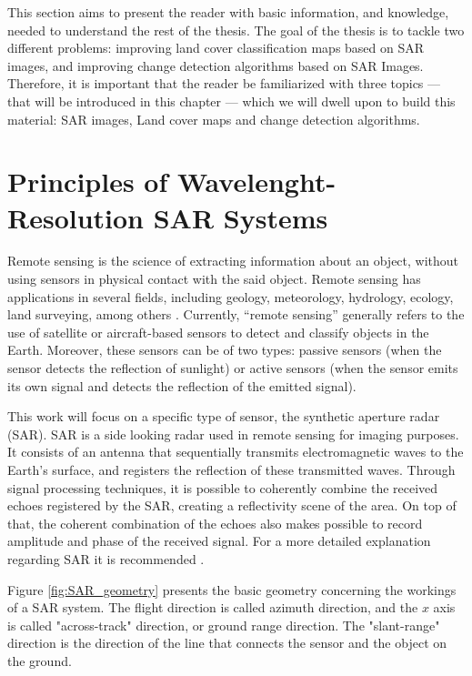 This section aims to present the reader with basic information, and knowledge, needed to understand the rest of the thesis. 
The goal of the thesis is to tackle two different problems: improving land cover classification maps based on SAR images, and improving 
change detection algorithms based on SAR Images. 
Therefore, it is important that the reader be familiarized with three topics --- that will be introduced in this chapter --- which we will dwell upon to build this material: SAR images, Land cover maps and
change detection algorithms.

\section{Principles of Wavelenght-Resolution SAR Systems}
Remote sensing is the science of extracting information about an object, without using sensors in physical contact with the said object. Remote sensing has applications in several fields, including geology, meteorology, hydrology, ecology, land surveying, among others \cite{survey-rs}. Currently, ``remote sensing'' generally refers to the use of satellite or aircraft-based sensors to detect and classify objects in the Earth. Moreover, these sensors can be of two types: passive sensors (when the sensor detects the reflection of sunlight) or active sensors (when the sensor emits its own signal and detects the reflection of the emitted signal).

This work will focus on a specific type of sensor, the synthetic aperture radar (SAR).
SAR is a side looking radar used in remote sensing for imaging purposes. It consists of an antenna that sequentially transmits electromagnetic waves to the Earth's surface, and registers the reflection of these transmitted waves. Through signal processing techniques, it is possible to coherently combine the received echoes registered by the SAR, creating a reflectivity scene of the area. On top of that, the coherent combination of the echoes also makes possible to record amplitude and phase of the received signal. For a more detailed explanation regarding SAR it is recommended \cite{Alberto, livro}.

Figure \ref{fig:SAR_geometry} presents the basic geometry concerning the workings of a SAR system. The flight direction is called azimuth direction, and the $x$ axis is called "across-track" direction, or ground range direction. The "slant-range" direction is the direction of the line that connects the sensor and the object on the ground.

